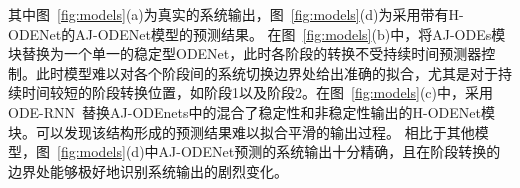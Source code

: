 其中图~\ref{fig:models}(a)为真实的系统输出，图~\ref{fig:models}(d)为采用带有H-ODENet的AJ-ODENet模型的预测结果。
在图~\ref{fig:models}(b)中，将AJ-ODEs模块替换为一个单一的稳定型ODENet，此时各阶段的转换不受持续时间预测器控制。此时模型难以对各个阶段间的系统切换边界处给出准确的拟合，尤其是对于持续时间较短的阶段转换位置，如阶段1以及阶段2。在图~\ref{fig:models}(c)中，采用ODE-RNN~\cite{10.5555/3454287.3454765}替换AJ-ODEnets中的混合了稳定性和非稳定性输出的H-ODENet模块。可以发现该结构形成的预测结果难以拟合平滑的输出过程。
相比于其他模型，图~\ref{fig:models}(d)中AJ-ODENet预测的系统输出十分精确，且在阶段转换的边界处能够极好地识别系统输出的剧烈变化。
